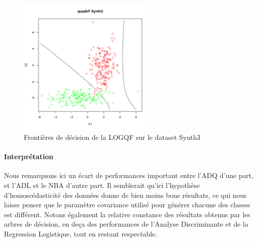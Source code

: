 \documentclass{report}
\begin{document}
\begin{figure}[ht!]
\begin{center}
    \includegraphics[width=0.6\textwidth]{results/quadlrf/quadlrf-Synth3.pdf}
    \caption{Frontières de décision de la LOGQF sur le dataset Synth3}
\end{center}
\end{figure}

\clearpage
\paragraph{Interprétation}
Nous remarquons ici un écart de performances important entre l'ADQ d'une part, et l'ADL et le NBA d'autre part. Il semblerait qu'ici l'hypothèse d'homoscédasticité des données donne de bien moins bons résultats, ce qui nous laisse penser que le paramètre covariance utilisé pour générer chacune des classes est différent. Notons également la relative constance des résultats obtenus par les arbres de décision, en deça des performances de l'Analyse Discriminante et de la Regression Logistique, tout en restant respectable.
\end{document}
